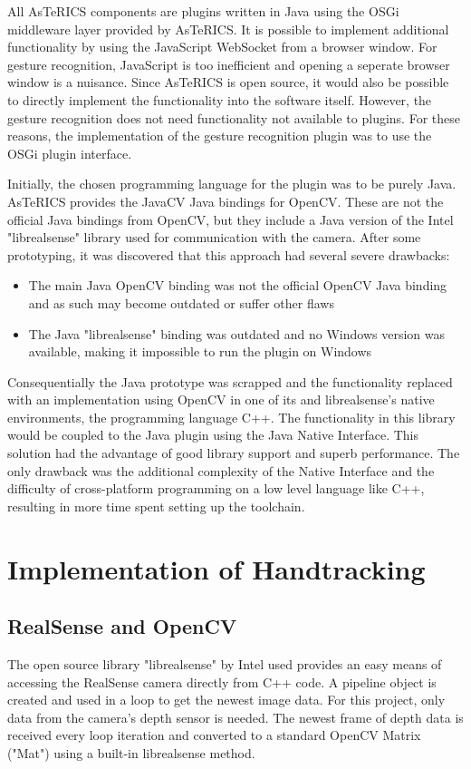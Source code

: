 \documentclass[BSA,Bachelor,english]{twbook}%
\begin{document}
All AsTeRICS components are plugins written in Java using the OSGi middleware layer provided by AsTeRICS. It is possible to implement additional functionality by using the JavaScript WebSocket from a browser window. For gesture recognition, JavaScript is too inefficient and opening a seperate browser window is a nuisance. Since AsTeRICS is open source, it would also be possible to directly implement the functionality into the software itself. However, the gesture recognition does not need functionality not available to plugins. For these reasons, the implementation of the gesture recognition plugin was to use the OSGi plugin interface.

Initially, the chosen programming language for the plugin was to be purely Java. AsTeRICS provides the JavaCV Java bindings for OpenCV. These are not the official Java bindings from OpenCV, but they include a Java version of the Intel "librealsense" library used for communication with the camera. After some prototyping, it was discovered that this approach had several severe drawbacks:

\begin{itemize}
	\item The main Java OpenCV binding was not the official OpenCV Java binding and as such may become outdated or suffer other flaws
	\item The Java "librealsense" binding was outdated and no Windows version was available, making it impossible to run the plugin on Windows
\end{itemize}

Consequentially the Java prototype was scrapped and the functionality replaced with an implementation using OpenCV in one of its and librealsense's native environments, the programming language C++. The functionality in this library would be coupled to the Java plugin using the Java Native Interface. This solution had the advantage of good library support and superb performance. The only drawback was the additional complexity of the Native Interface and the difficulty of cross-platform programming on a low level language like C++, resulting in more time spent setting up the toolchain.

\section{Implementation of Handtracking}
\subsection{RealSense and OpenCV}
The open source library "librealsense" by Intel used provides an easy means of accessing the RealSense camera directly from C++ code. A pipeline object is created and used in a loop to get the newest image data. For this project, only data from the camera's depth sensor is needed. The newest frame of depth data is received every loop iteration and converted to a standard OpenCV Matrix ("Mat") using a built-in librealsense method.
\end{document}
